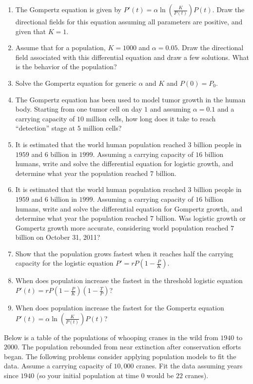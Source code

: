 \documentclass{exercises}
\begin{document}
\begin{enumerate}[resume]
\item The Gompertz equation is given by $P'(t)=\alpha \ln(\frac{K}{P(t)})P(t)$. Draw the directional fields for this equation assuming all parameters are positive, and given that $K=1$.
\item Assume that for a population, $K=1000$ and $\alpha=0.05$. Draw the directional field associated with this differential equation and draw a few solutions. What is the behavior of the population?
\item Solve the Gompertz equation for generic $\alpha$ and $K$ and $P(0)=P_{0}$.
\item \techrequired The Gompertz equation has been used to model tumor growth in the human body. Starting from one tumor cell on day $1$ and assuming $\alpha=0.1$ and a carrying capacity of $10$ million cells, how long does it take to reach ``detection'' stage at $5$ million cells?
\item \techrequired It is estimated that the world human population reached $3$ billion people in $1959$ and $6$ billion in $1999$. Assuming a carrying capacity of $16$ billion humans, write and solve the differential equation for logistic growth, and determine what year the population reached $7$ billion.
\item \techrequired It is estimated that the world human population reached $3$ billion people in $1959$ and $6$ billion in $1999$. Assuming a carrying capacity of $16$ billion humans, write and solve the differential equation for Gompertz growth, and determine what year the population reached $7$ billion. Was logistic growth or Gompertz growth more accurate, considering world population reached $7$ billion on October 31, 2011?
\item Show that the population grows fastest when it reaches half the carrying capacity for the logistic equation $P'=rP(1-\frac{P}{K})$.
\item When does population increase the fastest in the threshold logistic equation $P'(t)=rP(1-\frac{P}{K})(1-\frac{T}{P})$?
\item When does population increase the fastest for the Gompertz equation $P'(t)=\alpha \ln(\frac{K}{P(t)})P(t)$?
\end{enumerate}

Below is a table of the populations of whooping cranes in the wild from $1940$ to $2000$. The population rebounded from near extinction after conservation efforts began. The following problems consider applying population models to fit the data. Assume a carrying capacity of $10{,}000$ cranes. Fit the data assuming years since $1940$ (so your initial population at time $0$ would be $22$ cranes).
\end{document}
